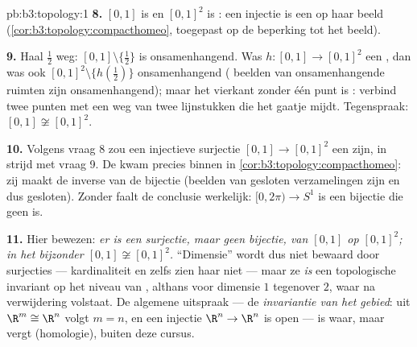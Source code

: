 \begin{solution}{pb:b3:topology:1}
\textbf{8.} $[0,1]$ is  en $[0,1]^2$ is : een
 injectie is een  op haar beeld
(\cref{cor:b3:topology:compacthomeo}, toegepast op de beperking
tot het beeld).

\textbf{9.} Haal $\frac12$ weg: $[0,1]\setminus\{\frac12\}$ is
onsamenhangend. Was $h \colon [0,1] \to [0,1]^2$ een
, dan was ook $[0,1]^2\setminus\{h(\frac12)\}$
onsamenhangend ( beelden van onsamenhangende ruimten
zijn onsamenhangend); maar het vierkant zonder één punt is
: verbind twee punten met een weg van twee
lijnstukken die het gaatje mijdt. Tegenspraak: $[0,1] \not\cong
[0,1]^2$.

\textbf{10.} Volgens vraag 8 zou een injectieve  surjectie
$[0,1] \to [0,1]^2$ een  zijn, in strijd met vraag 9.
De  kwam precies binnen in
\cref{cor:b3:topology:compacthomeo}: zij maakt de inverse van de
 bijectie  (beelden van gesloten verzamelingen zijn
 en dus gesloten). Zonder  faalt de conclusie
werkelijk: $[0, 2\pi) \to S^1$ is een  bijectie die geen
 is.

\textbf{11.} Hier bewezen: \emph{er is een  surjectie,
maar geen  bijectie, van $[0,1]$ op $[0,1]^2$; in het
bijzonder $[0,1] \not\cong [0,1]^2$.} ``Dimensie'' wordt dus niet
bewaard door  surjecties --- kardinaliteit en zelfs
 zien haar niet --- maar ze \emph{is} een
topologische invariant op het niveau van , althans
voor dimensie $1$ tegenover $2$, waar  na verwijdering
volstaat. De algemene uitspraak --- de \emph{invariantie van het
gebied}: uit $\R^m \cong \R^n$ volgt $m = n$, en een 
injectie $\R^n \to \R^n$ is open --- is waar, maar vergt
  (homologie), buiten deze cursus.


\end{solution}
